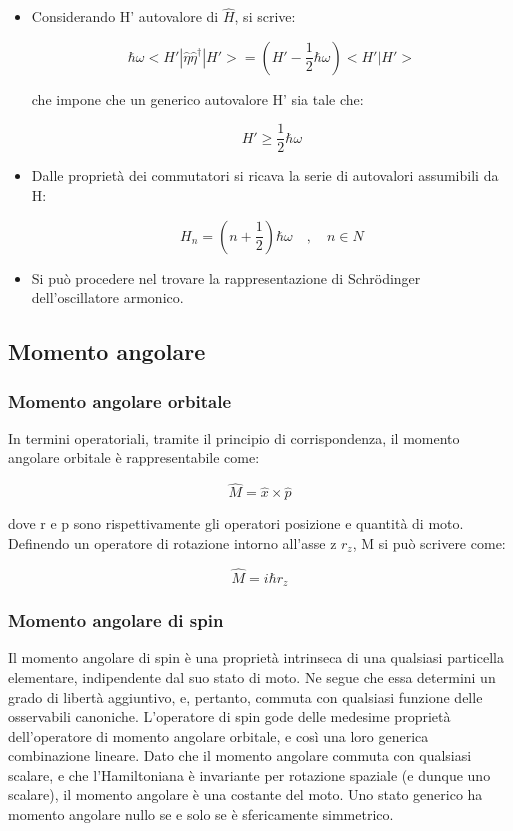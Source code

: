 \documentclass{article}
\begin{document}
\begin{itemize}
    \item Considerando H' autovalore di $\hat{H}$, si scrive:
    
    \begin{equation}
        \hbar \omega<H' |\hat{\eta}\hat{\eta}^{\dagger}|H'>=(H'-\frac{1}{2}\hbar \omega)<H' |H'>
    \end{equation}

    che impone che un generico autovalore H' sia tale che:

    \begin{equation}
        H'\geq \frac{1}{2}\hbar \omega
    \end{equation}

    \item Dalle proprietà dei commutatori si ricava la serie di autovalori assumibili da H:
    
    \begin{equation}
        H_n=(n+\frac{1}{2})\hbar \omega \quad , \quad n \in N
    \end{equation}

    \item Si può procedere nel trovare la rappresentazione di Schrödinger dell'oscillatore armonico.
\end{itemize}

\subsection{Momento angolare}
\subsubsection{Momento angolare orbitale}
In termini operatoriali, tramite il principio di corrispondenza, il momento angolare orbitale è rappresentabile come:

\begin{equation}
    \hat{M}=\hat{x}\times \hat{p}
\end{equation}

dove r e p sono rispettivamente gli operatori posizione e quantità di moto.
Definendo un operatore di rotazione intorno all'asse z $r_z$, M si può scrivere come:

\begin{equation}
    \hat{M}= i\hbar r_z
\end{equation}

\subsubsection{Momento angolare di spin}
Il momento angolare di spin è una proprietà intrinseca di una qualsiasi particella elementare, indipendente dal suo stato di moto.
Ne segue che essa determini un grado di libertà aggiuntivo, e, pertanto, commuta con qualsiasi funzione delle osservabili canoniche.
L'operatore di spin gode delle medesime proprietà dell'operatore di momento angolare orbitale, e così una loro generica combinazione lineare.
Dato che il momento angolare commuta con qualsiasi scalare, e che l'Hamiltoniana è invariante per rotazione spaziale (e dunque uno scalare), il momento angolare è una costante del moto.
Uno stato generico ha momento angolare nullo se e solo se è sfericamente simmetrico.
\end{document}
